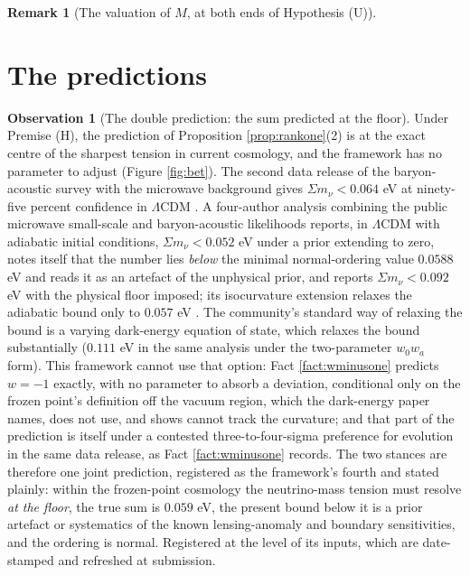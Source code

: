 \documentclass[11pt]{article}
\theoremstyle{definition}
\newtheorem{remark}[theorem]{Remark}
\newtheorem{observation}[theorem]{Observation}
\newcommand{\mnu}{\Sigma m_{\nu}}
\begin{document}
\begin{remark}[The valuation of $M$, at both ends of Hypothesis (U)]
\end{remark}

\section{The predictions}\label{sec:bets}

\begin{observation}[The double prediction: the sum predicted at the floor]\label{prop:doublebet}
Under Premise (H), the prediction of Proposition \ref{prop:rankone}(2) is at the exact centre of the sharpest tension in current cosmology, and the framework has no parameter to adjust (Figure \ref{fig:bet}). The second data release of the baryon-acoustic survey with the microwave background gives $\mnu < 0.064$ eV at ninety-five percent confidence in $\Lambda$CDM \cite{DESI2025}. A four-author analysis combining the public microwave small-scale and baryon-acoustic likelihoods reports, in $\Lambda$CDM with adiabatic initial conditions, $\mnu < 0.052$ eV under a prior extending to zero, notes itself that the number lies \emph{below} the minimal normal-ordering value $0.0588$ eV and reads it as an artefact of the unphysical prior, and reports $\mnu < 0.092$ eV with the physical floor imposed; its isocurvature extension relaxes the adiabatic bound only to $0.057$ eV \cite{HouWangZhaoZhang2026}. The community's standard way of relaxing the bound is a varying dark-energy equation of state, which relaxes the bound substantially ($0.111$ eV in the same analysis under the two-parameter $w_{0}w_{a}$ form). This framework cannot use that option: Fact \ref{fact:wminusone} predicts $w = -1$ exactly, with no parameter to absorb a deviation, conditional only on the frozen point's definition off the vacuum region, which the dark-energy paper names, does not use, and shows cannot track the curvature; and that part of the prediction is itself under a contested three-to-four-sigma preference for evolution in the same data release, as Fact \ref{fact:wminusone} records. The two stances are therefore one joint prediction, registered as the framework's fourth and stated plainly: within the frozen-point cosmology the neutrino-mass tension must resolve \emph{at the floor}, the true sum is $0.059$ eV, the present bound below it is a prior artefact or systematics of the known lensing-anomaly and boundary sensitivities, and the ordering is normal. Registered at the level of its inputs, which are date-stamped and refreshed at submission.
\end{observation}
\end{document}
